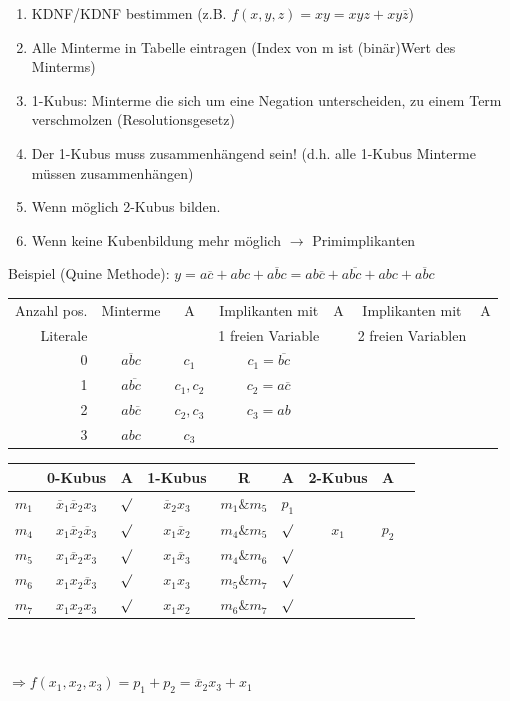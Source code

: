 \documentclass[6pt,a4paper]{scrartcl}
\newcommand{\ol}[1]{\ensuremath{\overline{#1}}}									%
\newcommand{\Ra}[0]{\ensuremath{\Rightarrow}}									%
\newcommand{\ra}[0]{\ensuremath{\rightarrow}} 									%
\begin{document}
\begin{multicols*}{3}
	\begin{enumerate}
		\item KDNF/KDNF bestimmen (z.B. $f(x,y,z) = xy = xyz + xy\overline z$)
		\item Alle Minterme in Tabelle eintragen (Index von m ist (binär)Wert des Minterms)
		\item 1-Kubus: Minterme die sich um eine Negation unterscheiden, zu einem Term verschmolzen (Resolutionsgesetz)
		\item Der 1-Kubus muss zusammenhängend sein! (d.h. alle 1-Kubus Minterme müssen zusammenhängen)
		\item Wenn möglich 2-Kubus bilden.
		\item Wenn keine Kubenbildung mehr möglich $\ra$ Primimplikanten
	\end{enumerate}
	Beispiel (Quine Methode):
  $y=a\overline{c} + abc + \overline{abc} = ab\overline{c} + a\overline{bc} + abc + \overline{abc}$
\begin{tabular}{r || c | c || c | c || c | l }
  Anzahl pos. & Minterme & A & Implikanten mit  & A &  Implikanten mit & A \\
  Literale & && 1 freien Variable& & 2 freien Variablen&\\
  \hline
  \hline
  0 & $\overline{abc}$ & $c_1$ & $c_1 = \overline{bc} $ &&&\\\hline
  1 & $a\overline{bc}$ & $c_1, c_2$ & $c_2 = a\overline{c} $ &&&\\\hline
  2 & $ab\overline{c}$ & $c_2, c_3$ & $c_3 = ab $ &&&\\\hline
  3 & $abc$ & $c_3$ &&&&\\
\end{tabular}

	\begin{tabular}{l | c | c  || c | c | c || c | c | r}
	      & 0-Kubus & A & 1-Kubus & R & A & 2-Kubus  & A \\ \hline
	$m_1$ & $\overline x_1 \overline x_2 x_3$ & $\surd$ & $\overline x_2 x_3$ & $m_1 \& m_5$ & $p_1$ & &\\
	$m_4$ & $x_1 \overline x_2 \overline x_3$ & $\surd$ & $x_1 \overline x_2$ & $m_4 \& m_5$ & $\surd$ & $x_1$ &   $p_2$\\
	$m_5$ & $x_1 \overline x_2  x_3$ & $\surd$  & $x_1 \overline x_3$ & $m_4 \& m_6$ & $\surd$& &\\
	$m_6$ & $x_1 x_2 \overline x_3$ & $ \surd$ & $x_1 x_3$ & $ m_5 \& m_7$ & $ \surd$ & &\\
	$m_7$ & $x_1 x_2 x_3$ & $\surd$ & $x_1 x_2$ & $m_6 \& m_7 $ & $ \surd$ & &\\
	\end{tabular} \\ \\
	$\Ra f(x_1,x_2,x_3)=p_1+p_2=\ol x_2x_3 + x_1$


\end{multicols*}
\end{document}
